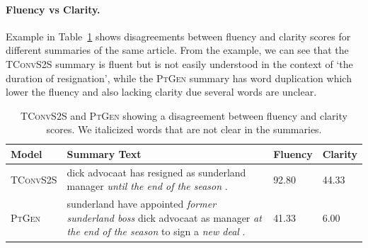 \documentclass[11pt,a4paper]{article}
\newcommand\highres{\textsc{HighRES}}
\newcommand\ptgen{\textsc{PtGen}}
\newcommand\tconv{\textsc{TConvS2S}}
\begin{document}
\paragraph{Fluency vs Clarity.} Example in Table~\ref{table:fluencyclarityexample} shows disagreements between fluency and clarity scores for different summaries of the same article. From the example, we can see that the \tconv{} summary is fluent but is not easily understood in the context of `the duration of resignation', while the \ptgen{} summary has word duplication which lower the fluency and also lacking clarity due several words are unclear. 
\begin{table}[t!]
\small
\begin{tabular}{p{1.5cm}|p{3.5cm}|p{0.7cm}p{0.7cm}}
\hline
\textbf{Model}     & \textbf{Summary Text}  & \textbf{Fluency} & \textbf{Clarity} \\
\hline
\tconv{}  & dick advocaat has resigned as sunderland manager \textit{until the end of the season} .                                          & 92.80   & 44.33   \\
\ptgen{}     & sunderland have appointed \textit{former sunderland boss} dick advocaat as manager \textit{at the end of the season} to sign a \textit{new deal} . & 41.33   & 6.00    \\
\hline
\end{tabular}
\caption{%
\tconv{} and \ptgen{} showing a disagreement between fluency and clarity scores. We italicized words that are not clear in the summaries.}
\label{table:fluencyclarityexample}
\end{table}
\end{document}
